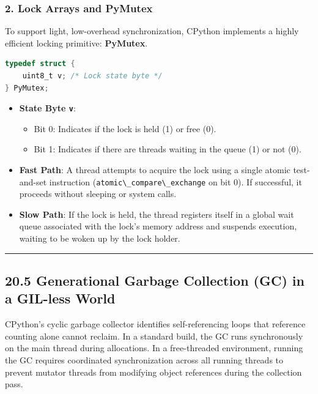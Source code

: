 \hypertarget{lock-arrays-and-pymutex}{%
\subsubsection{2. Lock Arrays and
PyMutex}\label{lock-arrays-and-pymutex}}

To support light, low-overhead synchronization, CPython implements a
highly efficient locking primitive: \textbf{PyMutex}.

\begin{lstlisting}[language=C]
typedef struct {
    uint8_t v; /* Lock state byte */
} PyMutex;
\end{lstlisting}

\begin{itemize}
\tightlist
\item
  \textbf{State Byte \passthrough{\lstinline!v!}}:

  \begin{itemize}
  \tightlist
  \item
    Bit 0: Indicates if the lock is held (1) or free (0).
  \item
    Bit 1: Indicates if there are threads waiting in the queue (1) or
    not (0).
  \end{itemize}
\item
  \textbf{Fast Path}: A thread attempts to acquire the lock using a
  single atomic test-and-set instruction
  (\passthrough{\lstinline!atomic\_compare\_exchange!} on bit 0). If
  successful, it proceeds without sleeping or system calls.
\item
  \textbf{Slow Path}: If the lock is held, the thread registers itself
  in a global wait queue associated with the lock's memory address and
  suspends execution, waiting to be woken up by the lock holder.
\end{itemize}

\begin{center}\rule{0.5\linewidth}{0.5pt}\end{center}

\hypertarget{generational-garbage-collection-gc-in-a-gil-less-world}{%
\subsection{20.5 Generational Garbage Collection (GC) in a GIL-less
World}\label{generational-garbage-collection-gc-in-a-gil-less-world}}

CPython's cyclic garbage collector identifies self-referencing loops
that reference counting alone cannot reclaim. In a standard build, the
GC runs synchronously on the main thread during allocations. In a
free-threaded environment, running the GC requires coordinated
synchronization across all running threads to prevent mutator threads
from modifying object references during the collection pass.

